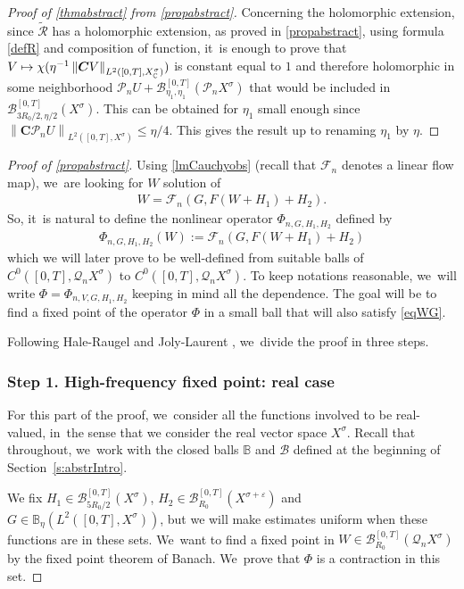\documentclass[11pt]{article}
\newcommand\mto{\mathchoice{\longmapsto}{\mapsto}{\mapsto}{\mapsto}}
\theoremstyle{definition}
\let\mc\mathcal
\let\veps\varepsilon
\newcommand{\B}{\mc{B}}
\newcommand{\Q}{\mathcal{Q}}
\renewcommand{\P}{\mathcal{P}}
\newcommand{\bC}{\boldsymbol{C}}
\newcommand\nor[2]{\left\|#1\right\|_{#2}}
\newcommand\FL{\mathcal{F}_{n}}
\begin{document}
\begin{proof}[Proof of \cref{thmabstract} from \cref{propabstract}]
Concerning the holomorphic extension, since $\mathcal{\widetilde{R}}$ has a holomorphic extension, as proved in \cref{propabstract}, using formula \eqref{defR} and composition of function, it~is enough to prove that $V\mto \chi(\eta^{-1} \nor{\bC V}{L^{2}([0,T],X^{\sigma}_{\mathbb{C}})})$ is constant equal to $1$ and therefore holomorphic in some neighborhood $\P_nU+ \B_{\eta_{1},\eta_{1}}^{[0,T]}(\P_n X^{\sigma})$ that would be included in $\B_{3R_0/2,\eta/2}^{[0,T]}(X^{\sigma})$. This can be obtained for $\eta_{1}$ small enough since $ \nor{\bC \P_n U}{L^{2}([0,T],X^{\sigma})}\leq \eta/4$. This gives the result up to renaming $\eta_{1}$ by $\eta$.
\end{proof}

\begin{proof}[Proof of \cref{propabstract}]
Using \cref{lmCauchyobs} (recall that $\FL$ denotes a linear flow map), we~are looking for $W$ solution of\vspace*{-3pt}
\begin{align*}
W=\FL (G,F(W+H_{1})+H_{2}).
\end{align*}
So, it~is natural to define the nonlinear operator $\Phi_{n,G,H_{1},H_{2}}$ defined by\vspace*{-3pt}
\begin{align}\label{defPhi}
\Phi_{n,G,H_{1},H_{2}}(W):=\FL (G,F(W+H_{1})+H_{2})
\end{align}
which we will later prove to be well-defined from suitable balls of $C^0([0, T], \Q_n X^\sigma)$ to $C^0([0, T], \Q_n X^\sigma)$. To keep notations reasonable, we~will write $\Phi=\Phi_{n,V,G,H_{1},H_{2}}$ keeping in mind all the dependence. The goal will be to find a fixed point of the operator $\Phi$ in a small ball that will also satisfy \eqref{eqWG}.

Following Hale-Raugel \cite[Th.\,2.14]{HR03} and Joly-Laurent \cite[Th.\,10.1]{2020:joly-laurent:decay-nlw-no-gcc}, we~divide the proof in three steps.

\subsubsection*{Step 1. High-frequency fixed point: real case} For this part of the proof, we~consider all the functions involved to be real-valued, in~the sense that we consider the real vector space $X^{\sigma}$. Recall that throughout, we~work with the closed balls $\mathbb{B}$ and $\B$ defined at the beginning of Section~\ref{s:abstrIntro}.

We fix $H_{1}\in \B_{5R_{0}/2}^{[0,T]}(X^{\sigma})$, $H_{2}\in \B_{R_{0}}^{[0,T]}(X^{\sigma+\veps})$ and $G\in \mathbb{B}_{\eta}(L^2([0, T], X^{\sigma}))$, but we will make estimates uniform when these functions are in these sets. We~want to find a fixed point in $W\in \B_{R_{0}}^{[0,T]}(\Q_n X^{\sigma})$ by the fixed point theorem of Banach. We~prove that $\Phi$ is a contraction in this set.


\end{proof}
\end{document}
